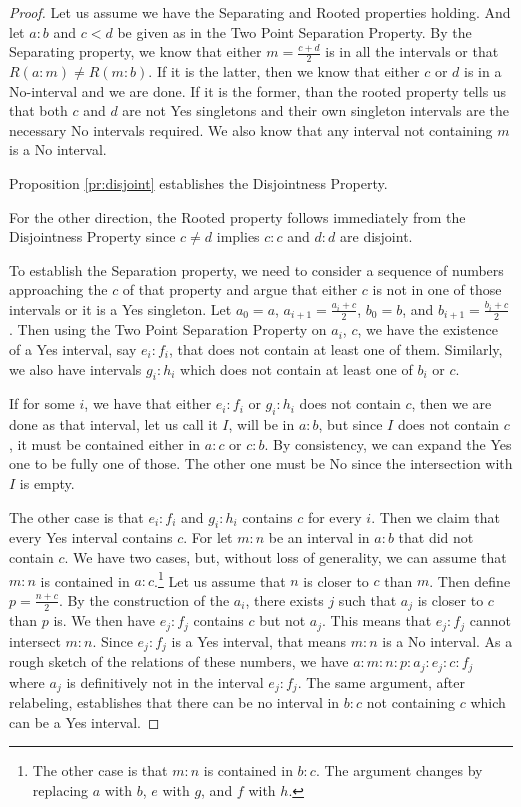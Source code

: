 \documentclass[12pt]{article}
\begin{document}
\begin{proof}
    Let us assume we have the Separating and Rooted properties holding. And let $a:b$ and $c < d$ be given as in the Two Point Separation Property. By the Separating property, we know that either $m =\frac{c+d}{2}$ is in all the intervals or that $R(a:m) \neq R(m:b)$. If it is the latter, then we know that either $c$ or $d$ is in a No-interval and we are done. If it is the former, than the rooted property tells us that both $c$ and $d$ are not Yes singletons and their own singleton intervals are the necessary No intervals required. We also know that any interval not containing $m$ is a No interval. 
    
    Proposition \ref{pr:disjoint} establishes the Disjointness Property. 

    For the other direction, the Rooted property follows immediately from the Disjointness Property since $c \neq d$ implies $c:c$ and $d:d$ are disjoint. 
    
    To establish the Separation property, we need to consider a sequence of numbers approaching the $c$ of that property and argue that either $c$ is not in one of those intervals or it is a Yes singleton. Let $a_0=a$, $a_{i+1} = \frac{a_i + c}{2}$, $b_0 = b$, and $b_{i+1} = \frac{b_i + c}{2}$. Then using the Two Point Separation Property on $a_i$, $c$, we have the existence of a Yes interval, say $e_i:f_i$, that does not contain at least one of them. Similarly, we also have intervals $g_i:h_i$ which does not contain at least one of $b_i$ or $c$. 
    
    If for some $i$,  we have that either $e_i:f_i$ or $g_i:h_i$ does not contain $c$, then we are done as that interval, let us call it $I$,  will be in $a:b$, but since $I$ does not contain $c$, it must be contained either in $a:c$ or $c:b$. By consistency, we can expand the Yes one to be fully one of those. The other one must be No since the intersection with $I$ is empty. 
    
    The other case is that $e_i:f_i$ and $g_i:h_i$ contains $c$ for every $i$. Then we claim that every Yes interval contains $c$. For let $m:n$ be an interval in $a:b$ that did not contain $c$. We have two cases, but, without loss of generality, we can assume that $m:n$ is contained in $a:c$.\footnote{The other case is that $m:n$ is contained in $b:c$. The argument changes by replacing $a$ with $b$, $e$ with $g$, and $f$ with $h$.} Let us assume that $n$ is closer to $c$ than $m$. Then define $p =\frac{n+c}{2}$. By the construction of the $a_i$, there exists $j$ such that $a_j$ is closer to $c$ than $p$ is. We then have $e_j:f_j$ contains $c$ but not $a_j$. This means that $e_j:f_j$ cannot intersect $m:n$. Since $e_j:f_j$ is a Yes interval, that means $m:n$ is a No interval. As a rough sketch of the relations of these numbers, we have $a:m:n:p:a_j:e_j:c:f_j$ where $a_j$ is definitively not in the interval $e_j:f_j$. The same argument, after relabeling, establishes that there can be no interval in $b:c$ not containing $c$ which can be a Yes interval. 


\end{proof}
\end{document}
